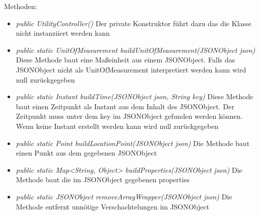 Methoden:
\begin{itemize}
    \item \emph{public UtilityController()}
    Der private Konstruktor führt dazu das die Klasse nicht instanziiert werden kann
    \item \emph{public static UnitOfMeasurement buildUnitOfMeasurement(JSONObject json)}
    Diese Methode baut eine Maßeinheit aus einem JSONObject. Falls das JSONObject nicht als UnitOfMeasurement interpretiert werden kann wird null zurückgegeben
    \item \emph{public static Instant buildTime(JSONObject json, String key)}
    Diese Methode baut einen Zeitpunkt als Instant aus dem Inhalt des JSONObject. Der Zeitpunkt muss unter dem key im JSONObject gefunden werden können.
    Wenn keine Instant erstellt werden kann wird null zurückgegeben
    \item \emph{public static Point buildLocationPoint(JSONObject json)}
    Die Methode baut einen Punkt aus dem gegebenen JSONObject
    \item \emph{public static Map<String, Object> buildProperties(JSONObject json)}
    Die Methode baut die im JSONObject gegebenen properties
    \item \emph{public static JSONObject removeArrayWrapper(JSONObject json)}
    Die Methode entfernt unnötige Verschachtelungen im JSONObject
\end{itemize}
